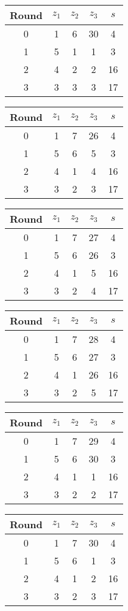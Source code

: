 \begin{multicols}{2}
\begin{tabular}{c | c | c | c | c }
Round & $z_1$ & $z_2$ & $z_3$ & $s$ \\
\hline
0 & 1 & 6 & 30 & 4 \\
1 & 5 & 1 & 1 & 3 \\
2 & 4 & 2 & 2 & 16 \\
3 & 3 & 3 & 3 & 17
\end{tabular}


\begin{tabular}{c | c | c | c | c }
Round & $z_1$ & $z_2$ & $z_3$ & $s$ \\
\hline
0 & 1 & 7 & 26 & 4 \\
1 & 5 & 6 & 5 & 3 \\
2 & 4 & 1 & 4 & 16 \\
3 & 3 & 2 & 3 & 17
\end{tabular}


\begin{tabular}{c | c | c | c | c }
Round & $z_1$ & $z_2$ & $z_3$ & $s$ \\
\hline
0 & 1 & 7 & 27 & 4 \\
1 & 5 & 6 & 26 & 3 \\
2 & 4 & 1 & 5 & 16 \\
3 & 3 & 2 & 4 & 17
\end{tabular}


\begin{tabular}{c | c | c | c | c }
Round & $z_1$ & $z_2$ & $z_3$ & $s$ \\
\hline
0 & 1 & 7 & 28 & 4 \\
1 & 5 & 6 & 27 & 3 \\
2 & 4 & 1 & 26 & 16 \\
3 & 3 & 2 & 5 & 17
\end{tabular}


\begin{tabular}{c | c | c | c | c }
Round & $z_1$ & $z_2$ & $z_3$ & $s$ \\
\hline
0 & 1 & 7 & 29 & 4 \\
1 & 5 & 6 & 30 & 3 \\
2 & 4 & 1 & 1 & 16 \\
3 & 3 & 2 & 2 & 17
\end{tabular}


\begin{tabular}{c | c | c | c | c }
Round & $z_1$ & $z_2$ & $z_3$ & $s$ \\
\hline
0 & 1 & 7 & 30 & 4 \\
1 & 5 & 6 & 1 & 3 \\
2 & 4 & 1 & 2 & 16 \\
3 & 3 & 2 & 3 & 17
\end{tabular}



\end{multicols}
